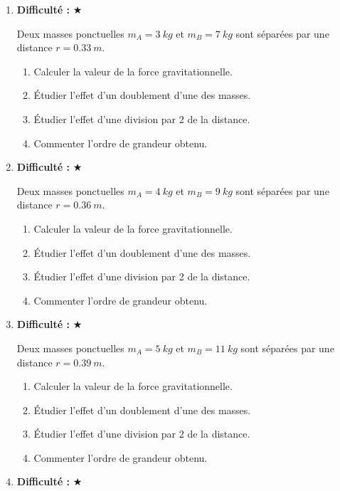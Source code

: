 \documentclass[11pt,a4paper]{article}
\newcommand{\etoiles}[1]{\textbf{Difficulté : }#1}
\begin{document}
\begin{enumerate}[label=\textbf{Exercice \arabic*.},leftmargin=*]
Deux charges ponctuelles $q_A$ et $q_B$ sont séparées par une distance $r$.
On donne $q_A=1\times 10^{-6}\ \si{C}$, $q_B=2\times 10^{-6}\ \si{C}$ et $r=30\ \si{cm}$.
\begin{enumerate}[label=\alph*)]
\item Calculer la valeur de la force électrostatique.
\item Préciser son sens pour des charges de même signe.
\item Refaire si les charges sont de signes opposés.
\item Étudier l'effet d'un doublement de la distance.
\end{enumerate}
\item \etoiles{★}

Deux masses ponctuelles $m_A=3\ \si{kg}$ et $m_B=7\ \si{kg}$ sont séparées par une distance $r=0.33\ \si{m}$.
\begin{enumerate}[label=\alph*)]
\item Calculer la valeur de la force gravitationnelle.
\item Étudier l'effet d'un doublement d'une des masses.
\item Étudier l'effet d'une division par 2 de la distance.
\item Commenter l'ordre de grandeur obtenu.
\end{enumerate}
\item \etoiles{★}

Deux masses ponctuelles $m_A=4\ \si{kg}$ et $m_B=9\ \si{kg}$ sont séparées par une distance $r=0.36\ \si{m}$.
\begin{enumerate}[label=\alph*)]
\item Calculer la valeur de la force gravitationnelle.
\item Étudier l'effet d'un doublement d'une des masses.
\item Étudier l'effet d'une division par 2 de la distance.
\item Commenter l'ordre de grandeur obtenu.
\end{enumerate}
\item \etoiles{★}

Deux masses ponctuelles $m_A=5\ \si{kg}$ et $m_B=11\ \si{kg}$ sont séparées par une distance $r=0.39\ \si{m}$.
\begin{enumerate}[label=\alph*)]
\item Calculer la valeur de la force gravitationnelle.
\item Étudier l'effet d'un doublement d'une des masses.
\item Étudier l'effet d'une division par 2 de la distance.
\item Commenter l'ordre de grandeur obtenu.
\end{enumerate}
\item \etoiles{★}


\end{enumerate}
\end{document}
